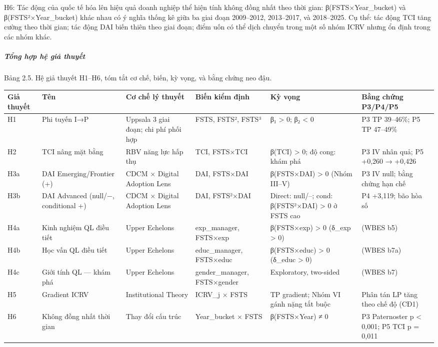 \documentclass[12pt,a4paper]{article}
\begin{document}
H6: Tác động của quốc tế hóa lên hiệu quả doanh nghiệp thể hiện tính
không đồng nhất theo thời gian: β(FSTS×Year\_bucket) và
β(FSTS²×Year\_bucket) khác nhau có ý nghĩa thống kê giữa ba giai đoạn
2009--2012, 2013--2017, và 2018--2025. Cụ thể: tác động TCI tăng cường
theo thời gian; tác động DAI biến thiên theo giai đoạn; điểm uốn có thể
dịch chuyển trong một số nhóm ICRV nhưng ổn định trong các nhóm khác.

\hypertarget{tux1ed5ng-hux1ee3p-hux1ec7-giux1ea3-thuyux1ebft}{%
\subparagraph{Tổng hợp hệ giả
thuyết}\label{tux1ed5ng-hux1ee3p-hux1ec7-giux1ea3-thuyux1ebft}}

Bảng 2.5. Hệ giả thuyết H1--H6, tóm tắt cơ chế, biến, kỳ vọng, và bằng
chứng neo đậu.

\begin{longtable}[]{@{}llllll@{}}
\toprule\noalign{}
Giả thuyết & Tên & Cơ chế lý thuyết & Biến kiểm định & Kỳ vọng & Bằng
chứng P3/P4/P5 \\
\midrule\noalign{}
\endhead
\bottomrule\noalign{}
\endlastfoot
H1 & Phi tuyến I→P & Uppsala 3 giai đoạn; chi phí phối hợp & FSTS,
FSTS², FSTS³ & β₁ \textgreater{} 0; β₂ \textless{} 0 & P3 TP 39--46\%;
P5 TP 47--49\% \\
H2 & TCI nâng mặt bằng & RBV năng lực hấp thụ & TCI, FSTS×TCI & β(TCI)
\textgreater{} 0; độ cong: khám phá & P3 IV nhân quả; P5 +0,260 →
+0,426 \\
H3a & DAI Emerging/Frontier (+) & CDCM × Digital Adoption Lens & DAI,
FSTS×DAI & β(FSTS×DAI) \textgreater{} 0 (Nhóm III--V) & P3 IV null; bằng
chứng hạn chế \\
H3b & DAI Advanced (null/−, conditional +) & CDCM × Digital Adoption
Lens & DAI, FSTS²×DAI & Direct: null/--; cond: β(FSTS²×DAI)
\textgreater{} 0 ở FSTS cao & P4 +3,119; bão hòa số \\
H4a & Kinh nghiệm QL điều tiết & Upper Echelons & exp\_manager, FSTS×exp
& β(FSTS×exp) \textgreater{} 0 (δ\_exp \textgreater{} 0) & (WBES b5) \\
H4b & Học vấn QL điều tiết & Upper Echelons & educ\_manager, FSTS×educ &
β(FSTS×educ) \textgreater{} 0 (δ\_educ \textgreater{} 0) & (WBES b7a) \\
H4c & Giới tính QL --- khám phá & Upper Echelons & gender\_manager,
FSTS×gender & Exploratory, two-sided & (WBES b7) \\
H5 & Gradient ICRV & Institutional Theory & ICRV\_j × FSTS & TP
gradient; Nhóm VI gánh nặng tắt buộc & Phân tán LP tăng theo chế độ
(CĐ1) \\
H6 & Không đồng nhất thời gian & Thay đổi cấu trúc & Year\_bucket × FSTS
& β(FSTS×Year) ≠ 0 & P3 Paternoster p \textless{} 0,001; P5 TCI p =
0,011 \\
\end{longtable}
\end{document}
